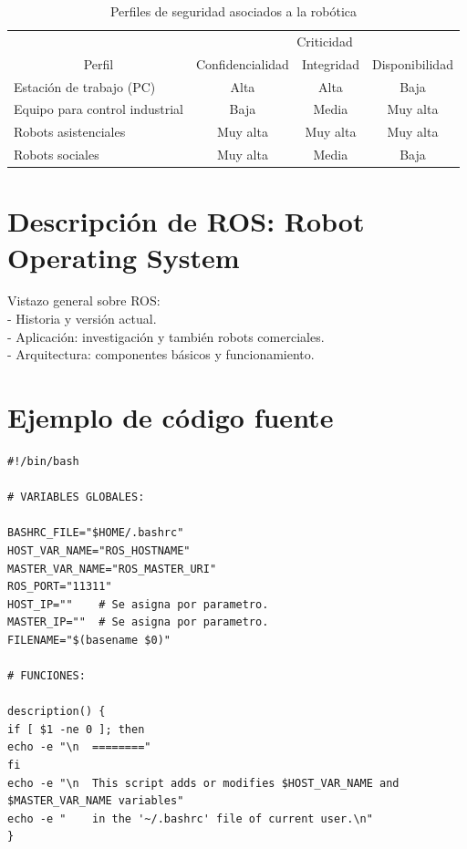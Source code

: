 \documentclass[12pt,a4paper,onecolumn,oneside]{report}
\begin{document}
\begin{table}[ht]
	\centering
	\caption{Perfiles de seguridad asociados a la robótica}
	\label{tabla1}
	\begin{tabular}{|l|ccc|}
		\cline{2-4}
		\multicolumn{1}{c}{} & \multicolumn{3}{|c|}{Criticidad} \\
		\cline{1-4}
		\multicolumn{1}{|c|}{Perfil} &  Confidencialidad & Integridad & Disponibilidad \\ \hline
		Estación de trabajo (PC) & Alta & Alta 	&  Baja \\
		Equipo para control industrial & Baja & Media & Muy alta \\
		Robots asistenciales & Muy alta & Muy alta & Muy alta \\
		Robots sociales & Muy alta & Media & Baja \\ \hline
	\end{tabular}
\end{table}


\section*{Descripción de ROS: Robot Operating System}
\label{ROS}

Vistazo general sobre ROS:\\
- Historia y versión actual.\\
- Aplicación: investigación y también robots comerciales.\\
- Arquitectura: componentes básicos y funcionamiento.


\section*{Ejemplo de código fuente}

\vspace{0.5cm}  %

\begin{lstlisting}
#!/bin/bash

# VARIABLES GLOBALES:

BASHRC_FILE="$HOME/.bashrc"
HOST_VAR_NAME="ROS_HOSTNAME"
MASTER_VAR_NAME="ROS_MASTER_URI"
ROS_PORT="11311"
HOST_IP=""    # Se asigna por parametro.
MASTER_IP=""  # Se asigna por parametro.
FILENAME="$(basename $0)"

# FUNCIONES:

description() {
if [ $1 -ne 0 ]; then
echo -e "\n  ========"
fi
echo -e "\n  This script adds or modifies $HOST_VAR_NAME and $MASTER_VAR_NAME variables"
echo -e "    in the '~/.bashrc' file of current user.\n"
}
\end{lstlisting}
\end{document}
